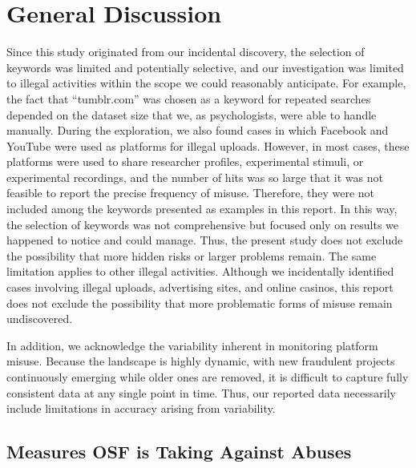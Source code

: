 \documentclass[authordate, meta, issue]{jote-new-article}
\begin{document}
	\section{General Discussion}



	Since this study originated from our incidental discovery, the selection of keywords was limited and potentially selective, and our investigation was limited to illegal activities within the scope we could reasonably anticipate. For example, the fact that “tumblr.com” was chosen as a keyword for repeated searches depended on the dataset size that we, as psychologists, were able to handle manually. During the exploration, we also found cases in which Facebook and YouTube were used as platforms for illegal uploads. However, in most cases, these platforms were used to share researcher profiles, experimental stimuli, or experimental recordings, and the number of hits was so large that it was not feasible to report the precise frequency of misuse. Therefore, they were not included among the keywords presented as examples in this report. In this way, the selection of keywords was not comprehensive but focused only on results we happened to notice and could manage. Thus, the present study does not exclude the possibility that more hidden risks or larger problems remain. The same limitation applies to other illegal activities. Although we incidentally identified cases involving illegal uploads, advertising sites, and online casinos, this report does not exclude the possibility that more problematic forms of misuse remain undiscovered.



	In addition, we acknowledge the variability inherent in monitoring platform misuse. Because the landscape is highly dynamic, with new fraudulent projects continuously emerging while older ones are removed, it is difficult to capture fully consistent data at any single point in time. Thus, our reported data necessarily include limitations in accuracy arising from variability.







	\subsection{Measures OSF is Taking Against Abuses}
\end{document}
